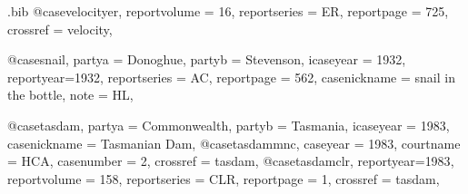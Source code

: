 \begin{filecontents*}{\jobname.bib}
@case{velocityer,
  reportvolume = {16},
  reportseries = {ER},
  reportpage = {725},
  crossref = {velocity},
}





@case{snail,
  partya = {Donoghue}, 
  partyb = {Stevenson},
  icaseyear = {1932},
  reportyear={1932},
  reportseries = {AC},
  reportpage = {562},
  casenickname = {snail in the bottle},
  note = {HL},
	}


@case{tasdam,
  partya = {Commonwealth}, 
  partyb = {Tasmania},
  icaseyear = {1983},
  casenickname = {Tasmanian Dam},
  }
@case{tasdammnc,
  caseyear = {1983},
  courtname = {HCA},
  casenumber = {2},
  crossref = {tasdam},
  }
@case{tasdamclr,
  reportyear={1983},
  reportvolume = {158},
  reportseries = {CLR},
  reportpage = {1},
  crossref = {tasdam},
  	}


\end{filecontents*}
